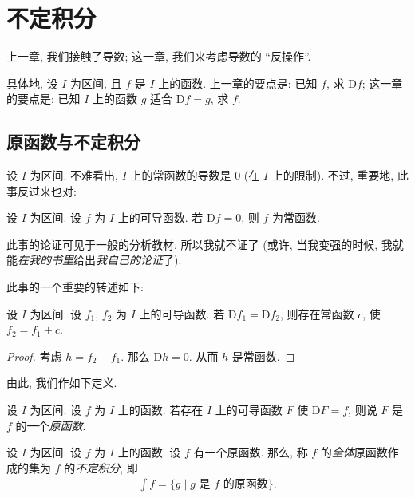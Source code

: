 \chapter{不定积分}

上一章, 我们接触了导数; 这一章, 我们来考虑导数的 ``反操作''.

具体地, 设 $I$ 为区间, 且 $f$ 是 $I$ 上的函数. 上一章的要点是: 已知 $f$, 求 $\mathrm{D}f$; 这一章的要点是: 已知 $I$ 上的函数 $g$ 适合 $\mathrm{D}f = g$, 求 $f$.

\section{原函数与不定积分}

设 $I$ 为区间. 不难看出, $I$ 上的常函数的导数是 $0$ (在 $I$ 上的限制). 不过, 重要地, 此事反过来也对:

\begin{theorem}
    设 $I$ 为区间. 设 $f$ 为 $I$ 上的可导函数. 若 $\mathrm{D}f = 0$, 则 $f$ 为常函数.
\end{theorem}

此事的论证可见于一般的分析教材, 所以我就不证了 (或许, 当我变强的时候, 我就能\emph{在我的书里}给出\emph{我自己的论证}了).

此事的一个重要的转述如下:

\begin{theorem}
    设 $I$ 为区间. 设 $f_1$, $f_2$ 为 $I$ 上的可导函数. 若 $\mathrm{D}{f_1} = \mathrm{D}{f_2}$, 则存在常函数 $c$, 使 $f_2 = f_1 + c$.
\end{theorem}

\begin{proof}
    考虑 $h = f_2 - f_1$. 那么 $\mathrm{D}h = 0$. 从而 $h$ 是常函数.
\end{proof}

由此, 我们作如下定义.

\begin{definition}
    设 $I$ 为区间. 设 $f$ 为 $I$ 上的函数. 若存在 $I$ 上的可导函数 $F$ 使 $\mathrm{D}F = f$, 则说 $F$ 是 $f$ 的一个\emph{原函数}.
\end{definition}

\begin{definition}
    设 $I$ 为区间. 设 $f$ 为 $I$ 上的函数. 设 $f$ 有一个原函数. 那么, 称 $f$ 的\emph{全体}原函数作成的集为 $f$ 的\emph{不定积分}, 即
    \begin{align*}
        \int {f} = \{ g \mid \text{$g$ 是 $f$ 的原函数} \}.
    \end{align*}
\end{definition}

